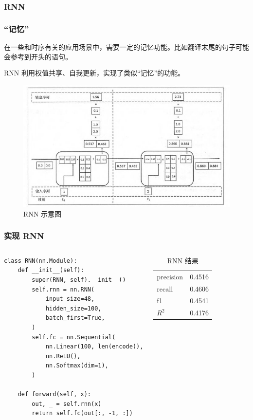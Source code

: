 \subsubsection{RNN}
\begin{frame}
    \frametitle{“记忆”}
    在一些和时序有关的应用场景中，需要一定的记忆功能。比如翻译末尾的句子可能会参考到开头的语句。

    RNN 利用权值共享、自我更新，实现了类似“记忆”的功能。
    \begin{figure}
        \includegraphics[width=0.6\linewidth]{../lib/RNN.jpeg}
        \caption{RNN 示意图}
        \label{RNN}
    \end{figure}
\end{frame}
\begin{frame}[fragile]
    \frametitle{实现 RNN}
    \begin{columns}
        \begin{verbatim}
class RNN(nn.Module):
    def __init__(self):
        super(RNN, self).__init__()
        self.rnn = nn.RNN(
            input_size=48,
            hidden_size=100,
            batch_first=True,
        )
        self.fc = nn.Sequential(
            nn.Linear(100, len(encode)),
            nn.ReLU(),
            nn.Softmax(dim=1),
        )

    def forward(self, x):
        out, _ = self.rnn(x)
        return self.fc(out[:, -1, :])
        \end{verbatim}
        \begin{table}
            \caption{RNN 结果}
            \begin{tabular}{ll}
                precision & 0.4516 \\
                recall    & 0.4606 \\
                f1        & 0.4541 \\
                \(R^2\)   & 0.4176 \\
            \end{tabular}
            \label{RNNres}
        \end{table}
    \end{columns}
\end{frame}
